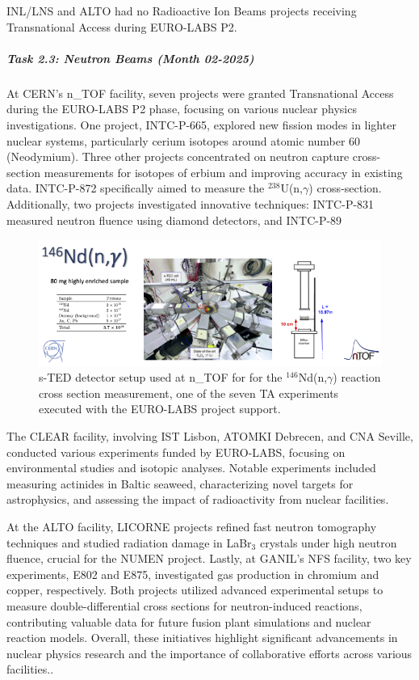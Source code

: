 INL/LNS and ALTO had no Radioactive Ion Beams projects receiving Transnational Access during EURO-LABS P2.

\subparagraph{Task 2.3: Neutron Beams (Month 02-2025)} \mbox{}


At CERN's n\_TOF facility, seven projects were granted Transnational Access during the EURO-LABS P2 phase, focusing on various nuclear physics investigations. One project, INTC-P-665, explored new fission modes in lighter nuclear systems, particularly cerium isotopes around atomic number 60 (Neodymium). Three other projects concentrated on neutron capture cross-section measurements for isotopes of erbium and improving accuracy in existing data. INTC-P-872 specifically aimed to measure the $^{238}$U(n,$\gamma$) cross-section. Additionally, two projects investigated innovative techniques: INTC-P-831 measured neutron fluence using diamond detectors, and INTC-P-89

\begin{figure}[!h]
    \centering
    \includegraphics[width=1.0\linewidth]{graphics/n_TOF-146Nd.png}
    \caption{s-TED detector setup used at n\_TOF for for the $^{146}$Nd(n,$\gamma$) reaction cross section measurement, one of the seven TA experiments executed with the EURO-LABS project support.}
    \label{fig:n_TOF-146Nd}
\end{figure}

The CLEAR facility, involving IST Lisbon, ATOMKI Debrecen, and CNA Seville, conducted various experiments funded by EURO-LABS, focusing on environmental studies and isotopic analyses. Notable experiments included measuring actinides in Baltic seaweed, characterizing novel targets for astrophysics, and assessing the impact of radioactivity from nuclear facilities. 

At the ALTO facility, LICORNE projects refined fast neutron tomography techniques and studied radiation damage in LaBr$_{3}$ crystals under high neutron fluence, crucial for the NUMEN project. Lastly, at GANIL's NFS facility, two key experiments, E802 and E875, investigated gas production in chromium and copper, respectively. Both projects utilized advanced experimental setups to measure double-differential cross sections for neutron-induced reactions, contributing valuable data for future fusion plant simulations and nuclear reaction models. Overall, these initiatives highlight significant advancements in nuclear physics research and the importance of collaborative efforts across various facilities..

